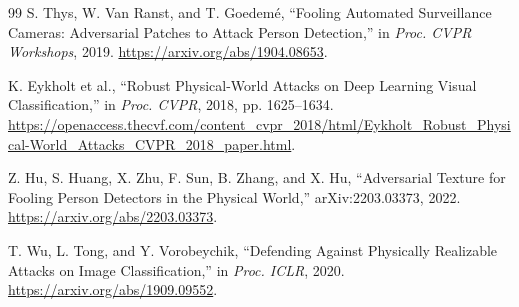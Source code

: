 \documentclass[a4paper,fleqn]{cas-dc}
\begin{document}
\begin{thebibliography}{99}
S. Thys, W. Van Ranst, and T. Goedemé, ``Fooling Automated Surveillance Cameras: Adversarial Patches to Attack Person Detection,'' in \emph{Proc. CVPR Workshops}, 2019. \url{https://arxiv.org/abs/1904.08653}.

K. Eykholt et al., ``Robust Physical-World Attacks on Deep Learning Visual Classification,'' in \emph{Proc. CVPR}, 2018, pp. 1625--1634. \url{https://openaccess.thecvf.com/content_cvpr_2018/html/Eykholt_Robust_Physical-World_Attacks_CVPR_2018_paper.html}.

Z. Hu, S. Huang, X. Zhu, F. Sun, B. Zhang, and X. Hu, ``Adversarial Texture for Fooling Person Detectors in the Physical World,'' arXiv:2203.03373, 2022. \url{https://arxiv.org/abs/2203.03373}.

T. Wu, L. Tong, and Y. Vorobeychik, ``Defending Against Physically Realizable Attacks on Image Classification,'' in \emph{Proc. ICLR}, 2020. \url{https://arxiv.org/abs/1909.09552}.

\end{thebibliography}
\end{document}
